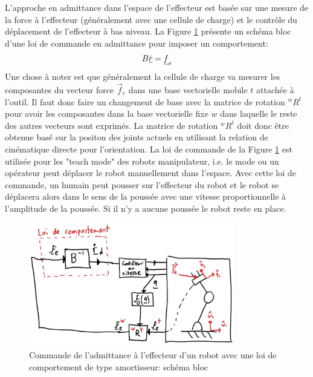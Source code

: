 L'approche en admittance dans l'espace de l'effecteur est basée sur une mesure de la force à l'effecteur (généralement avec une cellule de charge) et le contrôle du déplacement de l'effecteur à bas niveau. La Figure \ref{fig:admittancecontroltaskspace1} présente un schéma bloc d'une loi de commande en admittance pour imposer un comportement: %
\begin{align}
B \underline{\dot{r}} = \underline{f}_e
\end{align}
Une chose à noter est que généralement la cellule de charge va mesurer les composantes du vecteur force $\Vec{f}_e$ dans une base vectorielle mobile $t$ attachée à l'outil. Il faut donc faire un changement de base avec la matrice de rotation ${}^{w}R^t$ pour avoir les composantes dans la base vectorielle fixe $w$ dans laquelle le reste des autres vecteurs sont exprimés. La matrice de rotation ${}^{w}R^t$ doit donc être obtenue basé sur la positon des joints actuels en utilisant la relation de cinématique directe pour l'orientation. La loi de commande de la Figure \ref{fig:admittancecontroltaskspace1} est utilisée pour les "teach mode" des robots manipulateur, i.e. le mode ou un opérateur peut déplacer le robot manuellement dans l'espace. Avec cette loi de commande, un humain peut pousser sur l'effecteur du robot et le robot se déplacera alors dans le sens de la poussée avec une vitesse proportionnelle à l'amplitude de la poussée. Si il n'y a aucune poussée le robot reste en place. 
\begin{figure}[h]
	\centering
		\includegraphics[width=0.80\textwidth]{fig/admittancecontroltaskspace1.jpg}
	\caption{Commande de l'admittance à l'effecteur d'un robot avec une loi de comportement de type amortisseur: schéma bloc}
	\label{fig:admittancecontroltaskspace1}
\end{figure}


